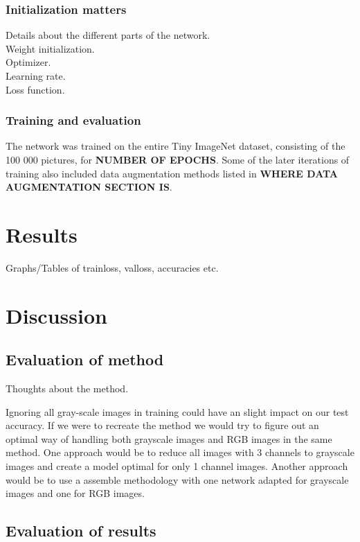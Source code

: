 \documentclass{kthreport}
\begin{document}
\subsubsection{Initialization matters}

Details about the different parts of the network.\\
Weight initialization.\\
Optimizer.\\
Learning rate.\\
Loss function.\\




\subsubsection{Training and evaluation}
The network was trained on the entire Tiny ImageNet dataset, consisting of the 100 000 pictures, for \textbf{NUMBER OF EPOCHS}. Some of the later iterations of training also included data augmentation methods listed in \textbf{WHERE DATA AUGMENTATION SECTION IS}.

\section{Results}
Graphs/Tables of trainloss, valloss, accuracies etc.


\section{Discussion}

\subsection{Evaluation of method}
Thoughts about the method.

Ignoring all gray-scale images in training could have an slight impact on our test accuracy. If we were to recreate the method we would try to figure out an optimal way of handling both grayscale images and RGB images in the same method. One approach would be to reduce all images with 3 channels to grayscale images and create a model optimal for only 1 channel images. Another approach would be to use a assemble methodology with one network adapted for grayscale images and one for RGB images.

\subsection{Evaluation of results}
\end{document}
